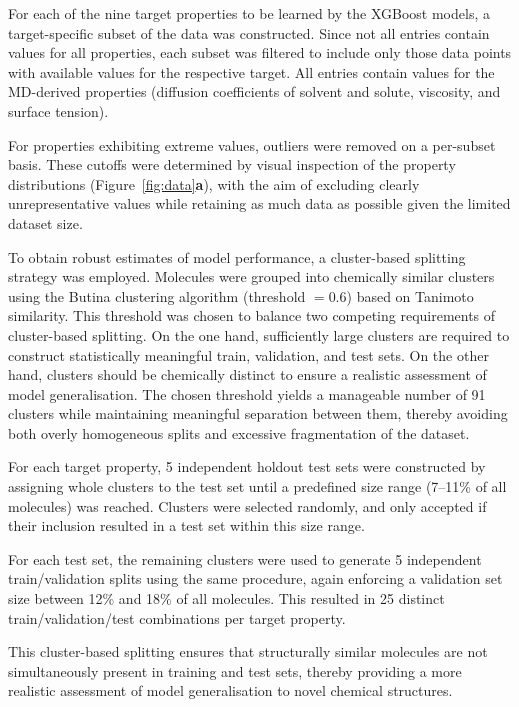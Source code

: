 \documentclass[letterpaper]{article}
\begin{document}
For each of the nine target properties to be learned by the XGBoost models, a target-specific subset of the data was constructed.  
Since not all entries contain values for all properties, each subset was filtered to include only those data points with available values for the respective target.  
All entries contain values for the MD-derived properties (diffusion coefficients of solvent and solute, viscosity, and surface tension).

For properties exhibiting extreme values, outliers were removed on a per-subset basis.  
These cutoffs were determined by visual inspection of the property distributions (Figure~\ref{fig:data}\textbf{a}), with the aim of excluding clearly unrepresentative values while retaining as much data as possible given the limited dataset size.

To obtain robust estimates of model performance, a cluster-based splitting strategy was employed.  
Molecules were grouped into chemically similar clusters using the Butina clustering algorithm (threshold $= 0.6$) based on Tanimoto similarity. 
This threshold was chosen to balance two competing requirements of cluster-based splitting. 
On the one hand, sufficiently large clusters are required to construct statistically meaningful train, validation, and test sets. 
On the other hand, clusters should be chemically distinct to ensure a realistic assessment of model generalisation. 
The chosen threshold yields a manageable number of 91 clusters while maintaining meaningful separation between them, thereby avoiding both overly homogeneous splits and excessive fragmentation of the dataset.

For each target property, 5 independent holdout test sets were constructed by assigning whole clusters to the test set until a predefined size range (7--11\% of all molecules) was reached.  
Clusters were selected randomly, and only accepted if their inclusion resulted in a test set within this size range.

For each test set, the remaining clusters were used to generate 5 independent train/validation splits using the same procedure, again enforcing a validation set size between 12\% and 18\% of all molecules.  
This resulted in 25 distinct train/validation/test combinations per target property.

This cluster-based splitting ensures that structurally similar molecules are not simultaneously present in training and test sets, thereby providing a more realistic assessment of model generalisation to novel chemical structures.
\end{document}
